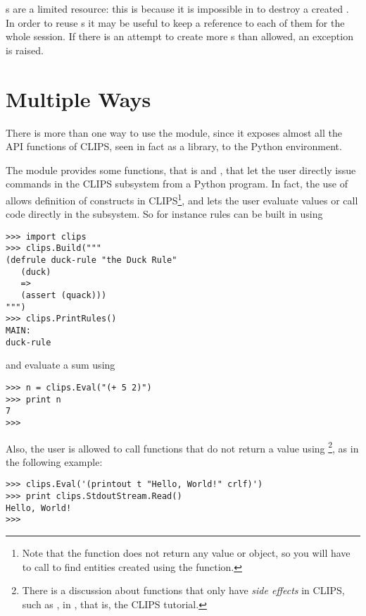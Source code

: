 s are a limited resource: this is because it is
impossible in \pyclips{} to destroy a created .
In order to reuse s it may be useful to keep a
reference to each of them for the whole \pyclips{} session. If there
is an attempt to create more s than allowed, an
exception is raised.



\section{Multiple Ways\label{pyclips-unotes-multiw}}

There is more than one way to use the \pyclips{} module, since it exposes
almost all the API functions of CLIPS, seen in fact as a library, to the
Python environment.

The module \pyclips{} provides some functions, that is 
and , that let the user directly issue commands in the
CLIPS subsystem from a Python program. In fact, the use of 
allows definition of constructs in CLIPS\footnote{Note that the
 function does not return any value or object, so you
will have to call  to find entities created
using the  function.}, and  lets the user
evaluate values or call code directly in the subsystem. So for instance
rules can be built in \pyclips{} using

\begin{verbatim}
>>> import clips
>>> clips.Build("""
(defrule duck-rule "the Duck Rule"
   (duck)
   =>
   (assert (quack)))
""")
>>> clips.PrintRules()
MAIN:
duck-rule
\end{verbatim}

and evaluate a sum using

\begin{verbatim}
>>> n = clips.Eval("(+ 5 2)")
>>> print n
7
>>>
\end{verbatim}

Also, the user is allowed to call functions that do not return a value
using \footnote{There is a discussion about functions
that only have \emph{side effects} in CLIPS, such as , in
\clipstut{}, that is, the CLIPS tutorial.}, as in the following example:

\begin{verbatim}
>>> clips.Eval('(printout t "Hello, World!" crlf)')
>>> print clips.StdoutStream.Read()
Hello, World!
>>>
\end{verbatim}

